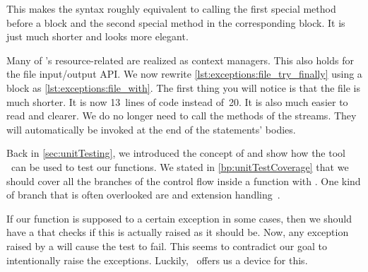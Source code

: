 This makes the syntax roughly equivalent to calling the first special method before a  block and the second special method in the corresponding  block.
It is just much shorter and looks more elegant.

%

Many of \python's resource-related  are realized as context managers.
This also holds for the file input/output API.
We now rewrite \cref{lst:exceptions:file_try_finally} using a  block as \cref{lst:exceptions:file_with}.
The first thing you will notice is that the file is much shorter.
It is now 13~lines of code instead of~20.
It is also much easier to read and clearer.
We do no longer need to call the  methods of the streams.
They will automatically be invoked at the end of the  statements' bodies.%
%
\FloatBarrier%
\endhsection%
%
\endhsection%
%
%
%
\label{sec:testingExceptions}%
%
%
%
%
%

Back in \cref{sec:unitTesting}, we introduced the concept of  and show how the tool \pytest\ can be used to test our functions.
We stated in \cref{bp:unitTestCoverage} that we should cover all the branches of the control flow inside a function with .
One kind of branch that is often overlooked are  and extension handling~\cite{LRBP2021AEHTPIOSL}.

If our function is supposed to  a certain exception in some cases, then we should have a  that checks if this  is actually raised as it should be.
Now, any exception raised by a  will cause the test to fail.
This seems to contradict our goal to intentionally raise the exceptions.
Luckily, \pytest\ offers us a device for this.

